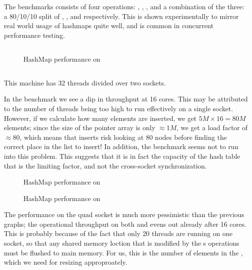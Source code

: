 The  benchmarks consists of four operations: , ,
, and a combination of the three: a 80/10/10 split of ,
, and  respectively. This is shown experimentally to mirror real world
usage of hashmaps quite well, and is common in concurrent performance testing.


\subsection{\gribb}

\begin{figure}[ht]
  \centering
  \caption{HashMap performance on \gribb}
\end{figure}


\clearpage
\subsection{\scaleway}

This machine has 32 threads divided over two sockets.


In the  benchmark we see a dip in throughput at 16 cores. This may be attributed to
the number of threads being too high to run effectively on a single socket. However, if we
calculate how many elements are inserted, we get $5M \times 16 = 80M$ elements; since the size of
the pointer array is only $\approx 1M$,  we get a load factor of $\approx 80$, which means that
inserts risk looking at 80 nodes before finding the correct place in the list to insert!
In addition, the  benchmark seems not to run into this problem. This suggests that it
is in fact the capacity of the hash table that is the limiting factor, and not the cross-socket
synchronization.

\clearpage
\begin{figure}[ht]
  \centering
  \caption{HashMap performance on \scaleway}
\end{figure}


\clearpage
\begin{figure}[ht]
  \centering
  \caption{HashMap performance on \mitserver{}}
\end{figure}

The  performance on the \mitserver{} quad socket is much more pessimistic than the
previous graphs; the operational throughput on both  and  evens out
already after 16 cores. This is probably because of the fact that only 20 threads are running on
one socket, so that any shared memory loction that is modified by the s operations
must be flushed to main memory. For us, this is the number of elements in the , which
we need for resizing approproately.

